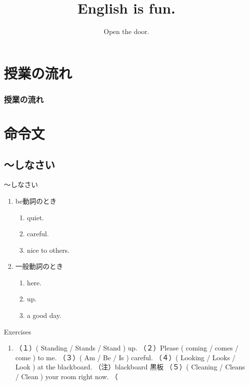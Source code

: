\documentclass[aspectratio=169,xcolor={dvipsnames,table}]{beamer}
\title{English is fun.}
\subtitle{Open the door.
}
\author{}
\institute[]{}
\date[]
\begin{document}
\begin{frame}[plain]
  \titlepage
\end{frame}

\section*{授業の流れ}
\begin{frame}[plain]
  \frametitle{授業の流れ}
  \tableofcontents
\end{frame}

\section{命令文}
\subsection{〜しなさい}
\begin{frame}[plain]{～しなさい}
 \large


\begin{enumerate}
 \item<2-> be動詞のとき
       \begin{enumerate}
	\item<3->  quiet.  
	\item<4->  careful.
	\item<5->  nice to others.
       \end{enumerate}
\item<6-> 一般動詞のとき
      \begin{enumerate}
	\item<7->  here.
	\item<8->  up.
	\item<9->  a good day.
      \end{enumerate}


\end{enumerate}

\end{frame}
\begin{frame}[plain]{Exercises}
 \begin{enumerate}
  \item （１）( Standing / Stands / Stand ) up.
（２）Please ( coming / comes / come ) to me.
（３）( Am / Be / Is ) careful.
（４）( Looking / Looks / Look ) at the blackboard. （注）blackboard 黒板
（５）( Cleaning / Cleans / Clean ) your room right now. （

 \end{enumerate}
\end{frame}
\end{document}
